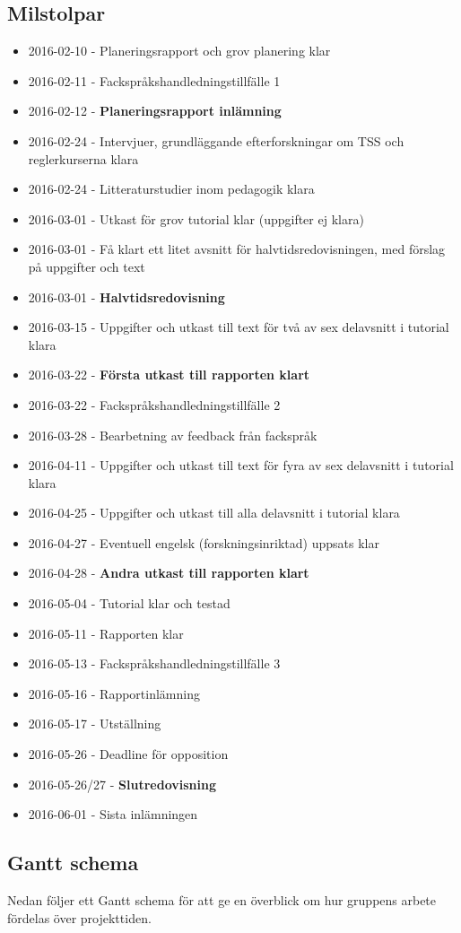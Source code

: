 \documentclass{article}
\begin{document}
\subsection{Milstolpar}
\begin{itemize}
 \item 2016-02-10 - Planeringsrapport och grov planering klar
 \item 2016-02-11 - Fackspråkshandledningstillfälle 1
 \item 2016-02-12 - \textbf{Planeringsrapport inlämning}
 \item 2016-02-24 - Intervjuer, grundläggande efterforskningar om TSS och reglerkurserna klara
 \item 2016-02-24 - Litteraturstudier inom pedagogik klara
 \item 2016-03-01 - Utkast för grov tutorial klar (uppgifter ej klara)
 \item 2016-03-01 - Få klart ett litet avsnitt för halvtidsredovisningen, med förslag på uppgifter och text
 \item 2016-03-01 - \textbf{Halvtidsredovisning}
 \item 2016-03-15 - Uppgifter och utkast till text för två av sex delavsnitt i tutorial klara
 \item 2016-03-22 - \textbf{Första utkast till rapporten klart}
 \item 2016-03-22 - Fackspråkshandledningstillfälle 2
 \item 2016-03-28 - Bearbetning av feedback från fackspråk
 \item 2016-04-11 - Uppgifter och utkast till text för fyra av sex delavsnitt i tutorial klara
 \item 2016-04-25 - Uppgifter och utkast till alla delavsnitt i tutorial klara
 \item 2016-04-27 - Eventuell engelsk (forskningsinriktad) uppsats klar
 \item 2016-04-28 - \textbf{Andra utkast till rapporten klart}
 \item 2016-05-04 - Tutorial klar och testad
 \item 2016-05-11 - Rapporten klar
 \item 2016-05-13 - Fackspråkshandledningstillfälle 3
 \item 2016-05-16 - Rapportinlämning
 \item 2016-05-17 - Utställning
 \item 2016-05-26 - Deadline för opposition
 \item 2016-05-26/27 - \textbf{Slutredovisning}
 \item 2016-06-01 - Sista inlämningen
\end{itemize}

\newpage
\subsection{Gantt schema}
Nedan följer ett Gantt schema för att ge en överblick om hur gruppens arbete fördelas över projekttiden.
\begin{figure}
    \centering
    
\end{figure}
\newpage

\printbibliography
\end{document}
